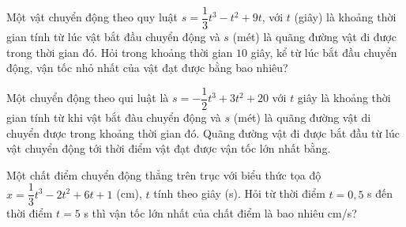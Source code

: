 \begin{ex}%
	Một vật chuyển động theo quy luật $s=\dfrac{1}{3}{t^3}-t^2+9t$, với $t$ (giây) là khoảng thời gian tính từ lúc vật bắt đầu chuyển động và $s$ (mét) là quãng đường vật đi được trong thời gian đó. Hỏi trong khoảng thời gian $ 10 $ giây, kể từ lúc bắt đầu chuyển động, vận tốc nhỏ nhất của vật đạt được bằng bao nhiêu? 
\end{ex}

\begin{ex}%
	Một chuyển động theo qui luật là $s=-\dfrac{1}{2}{t^3}+3t^2+20$ với $ t $ giây là khoảng thời gian tính từ khi vật bắt đàu chuyển động và $ s $ (mét) là quãng đường vật di chuyển được trong khoảng thời gian đó. Quãng đường vật đi được bắt đầu từ lúc vật chuyển động tới thời điểm vật đạt được  vận tốc lớn nhất bằng.
\end{ex}

\begin{ex}%
	Một chất điểm chuyển động thẳng trên trục với biểu thức tọa độ $x=\dfrac{1}{3}t^3-2t^2+6t+1$ (cm), $ t $ tính theo giây (s). Hỏi từ thời điểm $t=0{,}5$ s đến thời  điểm $t=5$ s thì vận tốc lớn nhất của chất điểm là bao nhiêu cm/s?
\end{ex}


